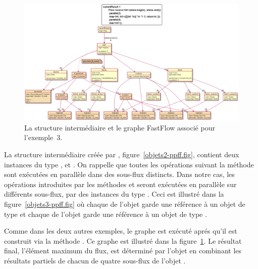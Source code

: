 \begin{figure}
\centering
         \includegraphics[width=1.0\textwidth]{Figures/objets3-ff.png}
      \caption{La structure interm\'ediaire  et le graphe FastFlow associ\'e pour l'exemple~3.}
       \label{objets3-ff.fig}
\end{figure}



La structure interm\'ediaire cr\'e\'ee par , figure~\ref{objets2-ppff.fig}, contient deux instances du type ,  et . On rappelle que toutes les op\'erations suivant la m\'ethode sont ex\'ecut\'ees en parall\`ele dans des sous-flux distincts. Dans notre cas, les op\'erations introduites par les m\'ethodes  et  seront ex\'ecut\'ees en parall\`ele sur diff\'erents sous-flux, par des instances du type . Ceci est illustré dans la figure~\ref{objets3-ppff.fig} o\`u chaque  de l'objet  garde une r\'ef\'erence \`a un objet de type  et chaque  de l'objet  garde une r\'ef\'erence \`a un objet de type . 

Comme dans les deux autres exemples, le graphe  est ex\'ecut\'e apr\'es qu'il est construit via la m\'ethode . Ce graphe est illustré dans la figure~\ref{objets3-ff.fig}. Le r\'esultat final, l'\'el\'ement maximum du flux, est d\'etermin\'e par l'objet  en combinant les r\'esultats partiels de chacun de quatre sous-flux de l'objet .

